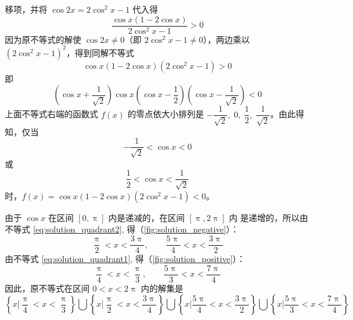 \begin{solution}
移项，并将 $\cos2x=2\cos^2x-1$ 代入得
\[\frac{\cos x(1-2\cos x)}{2\cos^2x-1}>0\] 
因为原不等式的解使 $\cos2x\ne 0$（即 $2\cos^2x-1\ne 0$），两边乘以 $(2\cos^2x-1)^2$，得到同解不等式
\[\cos x(1-2\cos x)(2\cos^2x-1)>0\]
即
\[\left(\cos x+\frac{1}{\sqrt{2}}\right)\cos x\left(\cos x-\frac{1}{2}\right)\left(\cos x-\frac{1}{\sqrt{2}}\right)<0\]
上面不等式右端的函数式 $f(x)$ 的零点依大小排列是 $-\dfrac{1}{\sqrt{2}},\; 0,\; \dfrac{1}{2},\; \dfrac{1}{\sqrt{2}}$。由此得知，仅当
\begin{equation}
  \label{eq:solution_quadrant2}
  -\frac{1}{\sqrt{2}}<\cos x<0
\end{equation}
或
\begin{equation}
  \label{eq:solution_quadrant1}
  \frac{1}{2}<\cos x<\frac{1}{\sqrt{2}}
\end{equation}
时，$f(x)=\cos x(1-2\cos x)(2\cos^2x-1)<0$。

由于 $\cos x$ 在区间 $[0,\uppi]$ 内是递减的，在区间 $[\uppi,2\uppi]$ 内
是递增的，所以由不等式 \eqref{eq:solution_quadrant2}, 得（\cref{fig:solution_negative}）：
\[\frac{\uppi}{2}<x<\frac{3\uppi}{4},\qquad \frac{5\uppi}{4}<x<\frac{3\uppi}{2}\]
由不等式 \eqref{eq:solution_quadrant1}, 得（\cref{fig:solution_positive}）：
\[\frac{\uppi}{4}<x<\frac{\uppi}{3},\qquad \frac{5\uppi}{3}<x<\frac{7\uppi}{4}\]
因此，原不等式在区间 $0<x<2\uppi$ 内的解集是
\[\left\{x\Big|\frac{\uppi}{4}<x<\frac{\uppi}{3} \right\}\bigcup\left\{x\Big|\frac{\uppi}{2}<x<\frac{3\uppi}{4} \right\}\bigcup\left\{x\Big|\frac{5\uppi}{4}<x<\frac{3\uppi}{2} \right\}\bigcup\left\{x\Big|\frac{5\uppi}{3}<x<\frac{7\uppi}{4} \right\}\]
\end{solution}

